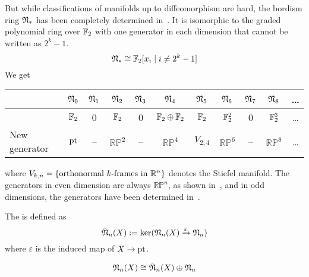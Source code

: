 \documentclass[a4paper,11pt]{article}
\begin{document}
But while classifications of manifolds up to diffeomorphism are hard, the bordism ring \(\mathfrak{N}_\ast\) has been completely determined in\ \cite{thom}. It is isomorphic to the graded polynomial ring over \(\mathbb{F}_2\) with one generator in each dimension that cannot be written as \(2^k-1\).
\[\mathfrak{N}_\ast\cong\mathbb{F}_2[x_i\mid i\neq 2^k-1]\]
We get \begin{center}
\begin{tabular}[c]{l|c|c|c|c|c|c|c|c|c|c}
    & $\mathfrak{N}_0$ & $\mathfrak{N}_1$ & $\mathfrak{N}_2$ & $\mathfrak{N}_3$ & $\mathfrak{N}_4$ & $\mathfrak{N}_5$ & $\mathfrak{N}_6$ & $\mathfrak{N}_7$ & $\mathfrak{N}_8$ & \dots\\ \hline
    & $\mathbb{F}_2$ & 0 & $\mathbb{F}_2$ & 0 & $\mathbb{F}_2\oplus\mathbb{F}_2$ & $\mathbb{F}_2$ & $\mathbb{F}_2^2$ & 0 & $\mathbb{F}_2^3$ & \dots\\ \hline
    New generator & $\mathrm{pt}$ & -- & $\mathbb{RP}^2$ & -- & $\mathbb{RP}^4$ & $V_{2,4}$ & $\mathbb{RP}^6$ & -- & $\mathbb{RP}^8$ & \dots
\end{tabular}
\end{center}
where \(V_{k,n}=\{\text{orthonormal }k\text{-frames in }\mathbb{R}^n\}\) denotes the Stiefel manifold. The generators in even dimension are always \(\mathbb{RP}^n\), as shown in\ \cite{thom}, and in odd dimensions, the generators have been determined in\ \cite{dold}.




\begin{definition}
    The  is defined as
    \[\tilde{\mathfrak{N}}_n(X):=\ker(\mathfrak{N}_n(X)\xrightarrow{\varepsilon}\mathfrak{N}_n)\]
    where \(\varepsilon\) is the induced map of \(X\to\mathrm{pt}\).
\end{definition}

\begin{remark}
    \[\mathfrak{N}_n(X)\cong\tilde{\mathfrak{N}}_n(X)\oplus\mathfrak{N}_n\]
\end{remark}
\end{document}

